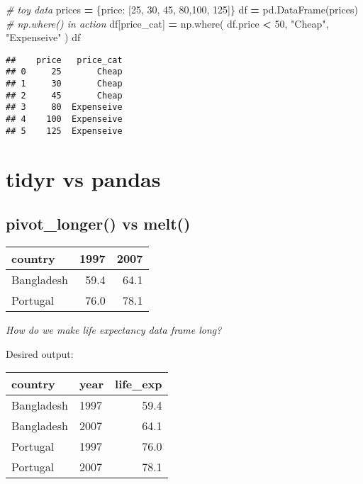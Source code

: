 \documentclass[
]{book}
\newenvironment{Shaded}{\begin{snugshade}}{\end{snugshade}}
\newcommand{\CommentTok}[1]{\textcolor[rgb]{0.56,0.35,0.01}{\textit{#1}}}
\newcommand{\DecValTok}[1]{\textcolor[rgb]{0.00,0.00,0.81}{#1}}
\newcommand{\NormalTok}[1]{#1}
\newcommand{\OperatorTok}[1]{\textcolor[rgb]{0.81,0.36,0.00}{\textbf{#1}}}
\newcommand{\StringTok}[1]{\textcolor[rgb]{0.31,0.60,0.02}{#1}}
\begin{document}
\begin{Shaded}
\begin{Highlighting}[]
\CommentTok{\# toy data}
\NormalTok{prices }\OperatorTok{=}\NormalTok{ \{}\StringTok{\textquotesingle{}price\textquotesingle{}}\NormalTok{: [}\DecValTok{25}\NormalTok{, }\DecValTok{30}\NormalTok{, }\DecValTok{45}\NormalTok{, }\DecValTok{80}\NormalTok{,}\DecValTok{100}\NormalTok{, }\DecValTok{125}\NormalTok{]\}}
\NormalTok{df }\OperatorTok{=}\NormalTok{ pd.DataFrame(prices)}
\CommentTok{\# np.where() in action}
\NormalTok{df[}\StringTok{\textquotesingle{}price\_cat\textquotesingle{}}\NormalTok{] }\OperatorTok{=}\NormalTok{ np.where(}
\NormalTok{  df.price }\OperatorTok{\textless{}} \DecValTok{50}\NormalTok{, }\StringTok{"Cheap"}\NormalTok{, }\StringTok{"Expenseive"}
\NormalTok{)}
\NormalTok{df}
\end{Highlighting}
\end{Shaded}

\begin{verbatim}
##    price   price_cat
## 0     25       Cheap
## 1     30       Cheap
## 2     45       Cheap
## 3     80  Expenseive
## 4    100  Expenseive
## 5    125  Expenseive
\end{verbatim}

\hypertarget{tidyr-vs-pandas}{%
\chapter{tidyr vs pandas}\label{tidyr-vs-pandas}}

\hypertarget{pivot_longer-vs-melt}{%
\section{pivot\_longer() vs melt()}\label{pivot_longer-vs-melt}}

\begin{longtable}[]{@{}lrr@{}}
\toprule
country & 1997 & 2007 \\
\midrule
\endhead
Bangladesh & 59.4 & 64.1 \\
Portugal & 76.0 & 78.1 \\
\bottomrule
\end{longtable}

{\emph{How do we make life expectancy data frame long?}}

Desired output:

\begin{longtable}[]{@{}llr@{}}
\toprule
country & year & life\_exp \\
\midrule
\endhead
Bangladesh & 1997 & 59.4 \\
Bangladesh & 2007 & 64.1 \\
Portugal & 1997 & 76.0 \\
Portugal & 2007 & 78.1 \\
\bottomrule
\end{longtable}
\end{document}
